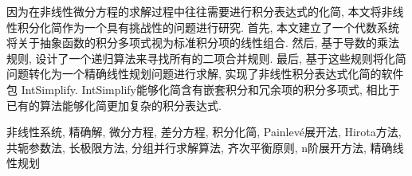 因为在非线性微分方程的求解过程中往往需要进行积分表达式的化简, 本文将非线性积分化简作为一个具有挑战性的问题进行研究. 首先, 本文建立了一个代数系统将关于抽象函数的积分多项式视为标准积分项的线性组合. 然后, 基于导数的乘法规则, 设计了一个递归算法来寻找所有的二项合并规则. 最后, 基于这些规则将化简问题转化为一个精确线性规划问题进行求解, 实现了非线性积分表达式化简的软件包 IntSimplify.  IntSimplify能够化简含有嵌套积分和冗余项的积分多项式, 相比于已有的算法能够化简更加复杂的积分表达式. 

\bigskip

非线性系统, 精确解, 微分方程, 差分方程, 积分化简, Painlevé展开法, Hirota方法, 共轭参数法, 长极限方法, 分组并行求解算法, 齐次平衡原则, n阶展开方法, 精确线性规划

